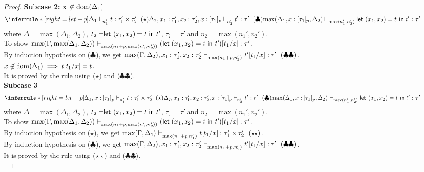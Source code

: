\documentclass{article}
\begin{document}
\begin{proof}
\textbf{Subcase 2: x $\not \in \text{dom}(\Delta_1)$ }
\[
   \inferrule*[ right = let-p ]
   {\Delta_1 \jtype{n_1'}{}{t}{\tau_1' \times \tau_2'}~(\star) \\ \Delta_2, x_1:\tau_1', x_2: \tau_2' , x: [\tau_1]_p \jtype{n_2'}{}{t'}{\tau'}~(\clubsuit)}
   {  \max(\Delta_1, x: [\tau_1]_p, \Delta_2) \jtype{\max(n_1',n_2')}{}{\letx{(x_1,x_2)}{t}{t'}}{\tau'}  }
\]
where $\Delta = \max(\Delta_1,\Delta_2)$, $t_2 = \mathrel{ \mathsf{let}\ {(x_1,x_2)} = {t} \ \mathsf{in} \ {t'} }$, $\tau_2 = \tau'$ and $n_2 =\max(n_1',n_2')$. \\
To show $ \max(\Gamma, \max(\Delta_1,\Delta_2) ) \mathrel{\vdash_{\max(n_1 + p,\max(n_1',n_2') )}^{} {  (\mathrel{ \mathsf{let}\ {(x_1,x_2)} = {t} \ \mathsf{in} \ {t'} })[t_1/x] } : {\tau'}}  $. \\
By induction hypothesis on ($\clubsuit$), we get $\max(\Gamma, \Delta_2), x_1:\tau_1', x_2: \tau_2'  \mathrel{\vdash_{\max(n_1 + p,n_2') }^{} {t'[t_1/x]} : {\tau'}}~(\clubsuit\clubsuit) $. \\
 $x \not \in \text{dom}(\Delta_1) \implies t[t_1/x] = t $.\\
It is proved by the rule  using ($\star$) and ($\clubsuit\clubsuit$). \\

\textbf{Subcase 3 }
\[
    \inferrule*[ right = let-p ]
   {\Delta_1 , x: [\tau_1]_p \jtype{n_1'}{}{t}{\tau_1' \times \tau_2'}~(\star) \\ \Delta_2, x_1:\tau_1', x_2: \tau_2' , x: [\tau_1]_p \jtype{n_2'}{}{t'}{\tau'}~(\clubsuit)}
   {  \max(\Delta_1, x: [\tau_1]_p, \Delta_2) \jtype{\max(n_1',n_2')}{}{\letx{(x_1,x_2)}{t}{t'}}{\tau'}  }
\]
where $\Delta = \max(\Delta_1,\Delta_2)$, $t_2 = \mathrel{ \mathsf{let}\ {(x_1,x_2)} = {t} \ \mathsf{in} \ {t'} }$, $\tau_2 = \tau'$ and $n_2 =\max(n_1',n_2')$. \\
To show $ \max(\Gamma, \max(\Delta_1,\Delta_2) ) \mathrel{\vdash_{\max(n_1 + p,\max(n_1',n_2') )}^{} {  (\mathrel{ \mathsf{let}\ {(x_1,x_2)} = {t} \ \mathsf{in} \ {t'} } )[t_1/x] } : {\tau'}}  $. \\
By induction hypothesis on ($\star$), we get $\max(\Gamma, \Delta_1) \jtype{\max(n_1 + p, n_1') }{}{t[t_1/x]}{\tau_1' \times \tau_2'}~(\star\star) $. \\
By induction hypothesis on ($\clubsuit$), we get $\max(\Gamma, \Delta_2),x_1: \tau_1', x_2:\tau_2' \mathrel{\vdash_{\max(n_1 + p,n_2') }^{} {t'[t_1/x]} : {\tau'}}~(\clubsuit\clubsuit) $. \\
It is proved by the rule  using ($\star\star$) and ($\clubsuit\clubsuit$).\\


\end{proof}
\end{document}
